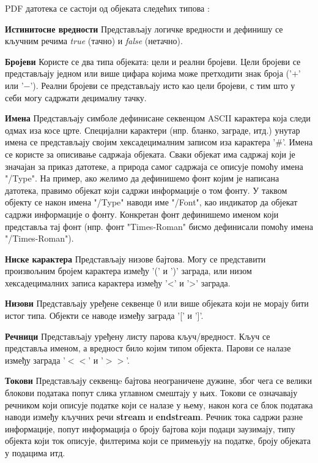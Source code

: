 \documentclass[12pt,oneside]{memoir}
\begin{document}
PDF датотека се састоји од објеката следећих типова \cite{PDFDoc, introToPdf, basicStrPdf}:
\begin{description}
\item \textbf{Истинитосне вредности} Представљају логичке вредности и дефинишу се кључним речима \textit{true} (тачно) и \textit{false} (нетачно).
\item \textbf{Бројеви} Користе се два типа објеката: цели и реални бројеви. Цели бројеви се представљају једном или више цифара којима може претходити знак броја ('$+$' или '$-$'). Реални бројеви се представљају исто као цели бројеви, с тим што у себи могу садржати децималну тачку.
\item \textbf{Имена} Представљају симболе дефинисане секвенцом ASCII карактера која следи одмах иза косе црте. Специјални карактери (нпр. бланко, заграде, итд.) унутар имена се представљају својим хексадецималним записом иза карактера '$\#$'. Имена се користе за описивање садржаја објеката. Сваки објекат има садржај који је значајан за приказ датотеке, а природа самог садржаја се описује помоћу имена "/Type". На пример, ако желимо да дефинишемо фонт којим је написана датотека, правимо објекат који садржи информације о том фонту. У таквом објекту се након имена "/Type" наводи име "/Font", као индикатор да објекат садржи информације о фонту. Конкретан фонт дефинишемо именом који представља тај фонт (нпр. фонт "Times-Roman" бисмо дефинисали помоћу имена "/Times-Roman").
\item \textbf{Ниске карактера} Представљају низове бајтова. Могу се представити произвољним бројем карактера између '(' и ')' заграда, или низом хексадецималних записа карактера између '<' и '>' заграда.
\item \textbf{Низови} Представљају уређене секвенце 0 или више објеката који не морају бити истог типа. Објекти се наводе између заграда '[' и ']'.
\item \textbf{Речници} Представљају уређену листу парова кључ/вредност. Кључ се представља именом, а вредност било којим типом објекта. Парови се налазе између заграда '$<<$' и '$>>$'.
\item \textbf{Токови} Представљају секвенцe бајтова неограничене дужине, због чега се велики блокови података попут слика углавном смештају у њих. Токови се означавају речником који описује податке који се налазе у њему, након кога се блок података наводи између кључних речи \textbf{stream} и \textbf{endstream}. Речник тока садржи разне информације, попут информација о броју бајтова који подаци заузимају, типу објекта који ток описује, филтерима који се примењују на податке, броју објеката у подацима итд.

\end{description}
\end{document}
